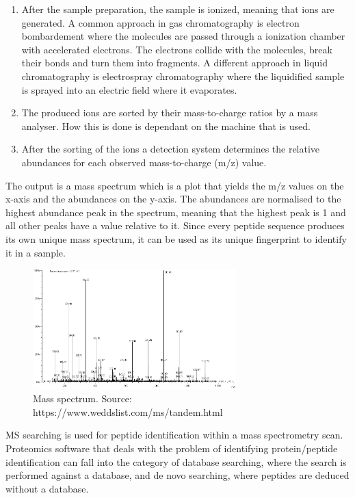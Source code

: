 \documentclass[12pt]{article}
\begin{document}
\begin{enumerate}
\item After the sample preparation, the sample is ionized, meaning that ions are generated. A common approach in gas chromatography is electron bombardement where the molecules are passed through a ionization chamber with accelerated electrons. The electrons collide with the molecules, break their bonds and turn them into fragments. A different approach in liquid
chromatography is electrospray chromatography where the liquidified sample is sprayed into an electric field where it evaporates.
\item The produced ions are sorted by their mass-to-charge ratios by a mass analyser. How this is done is dependant on the machine that is used.
\item After the sorting of the ions a detection system determines the relative abundances for each observed mass-to-charge (m/z) value.
\end{enumerate} 

The output is a mass spectrum which is a plot that yields the m/z values on the x-axis and the abundances on the y-axis. The abundances are normalised to the highest abundance peak in the spectrum, meaning that the highest peak is 1 and all other peaks have a value relative to it. Since every peptide sequence produces its own unique mass spectrum, it can be used as its unique fingerprint to identify it in a sample. 
\begin{figure}[ht]
    \centering
    \includegraphics[width=0.7\textwidth]{figs/tandem-spectrum.png}
    \caption{Mass spectrum. Source: https://www.weddslist.com/ms/tandem.html}
    \label{fig:tandem-spectrum}
\end{figure}

MS searching is used for peptide identification within a mass spectrometry scan. Proteomics software that deals with the problem of identifying protein/peptide identification can fall into the category of database searching, where the search is performed against a database, and de novo searching, where peptides are deduced without a database.
\end{document}
